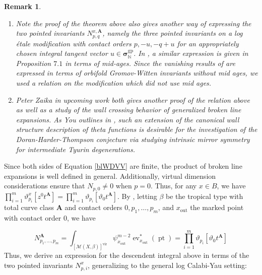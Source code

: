 \documentclass[12pt, oneside]{amsart}   	%
\newcounter{thm}
\newtheorem{remark}[thm]{Remark}
\newcommand{\NN}{\mathbb{N}}
\newcommand{\vir}{\operatorname{vir}}
\newcommand{\pt}{\operatorname{pt}}
\newcommand{\ev}{\operatorname{ev}}
\newcommand{\gp}{\operatorname{gp}}
\newcommand{\out}{\operatorname{out}}
\numberwithin{equation}{section}
\numberwithin{thm}{section}
\numberwithin{figure}{section}
\begin{document}
 \begin{remark}
 \begin{enumerate}
 \item Note the proof of the theorem above also gives another way of expressing the two pointed invariants $N_{p,q}^{x,\textbf{A}}$, namely the three pointed invariants on a log \'etale modification with contact orders $p,-u,-q+u$ for an appropriately chosen integral tangent vector $u \in \pmb\sigma^{\gp}_{\NN}$. In \cite{orbBL}, a similar expression is given in Proposition $7.1$ in terms of mid-ages. Since the vanishing results of \cite{logWDVV} are expressed in terms of orbifold Gromov-Witten invariants without mid ages, we used a relation on the modification which did not use mid ages. 
 \item Peter Zaika in upcoming work both gives another proof of the relation above as well as a study of the wall crossing behavior of generalized broken line expansions. As You outlines in \cite{orbBL}, such an extension of the canonical wall structure description of theta functions is desirable for the investigation of the Doran-Harder-Thompson conjecture via studying intrinsic mirror symmetry for intermediate Tyurin degenerations. 
 \end{enumerate}
 \end{remark}
 
Since both sides of Equation \ref{blWDVV} are finite, the product of broken line expansions is well defined in general. Additionally, virtual dimension considerations ensure that $N_{p,0} \not= 0$ when $p = 0$. Thus, for any $x \in B$, we have $\prod_{i=1}^m \vartheta_{p_i}^x[z^0t^\textbf{A}] = \prod_{i=1}^m \vartheta_{p_i}[\vartheta_0t^{\textbf{A}}]$. By \cite[Theorem $1.3$]{logWDVV}, letting $\beta$ be the tropical type with total curve class $\textbf{A}$ and contact orders $0,p_1,\ldots,p_m$, and $x_{\out}$ the marked point with contact order $0$, we have
 
 \[N_{p_1,\ldots,p_m}^{\textbf{A}} = \int_{[\mathscr{M}(X,\beta)]^{\vir}}\psi_{x_{\out}}^{m-2}\ev^*_{x_{\out}}(\pt) = \prod_{i=1}^m \vartheta_{p_i}[\vartheta_0t^{\textbf{A}}]\]
 Thus, we derive an expression for the descendent integral above in terms of the two pointed invariants $N_{p,i}^x$, generalizing \cite[Theorem $1.5$]{mirrcomp} to the general log Calabi-Yau setting:
 
\end{document}

